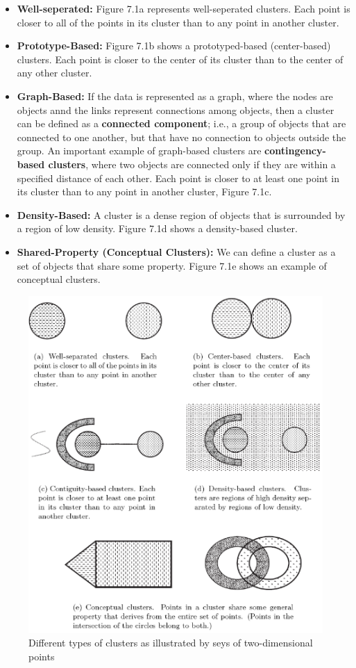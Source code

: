 		\begin{itemize}
			\item {\bf Well-seperated:} Figure 7.1a represents well-seperated clusters.
			Each point is closer to all of the points in its cluster than to any point 
			in another cluster.
			\item {\bf Prototype-Based:} Figure 7.1b shows a prototyped-based (center-based)
			clusters. Each point is closer to the center of its cluster than to the center of any
			other cluster. 
			\item {\bf Graph-Based:} If the data is represented as a graph, where the nodes
			are objects annd the links represent connections among objects, then a cluster can be
			defined as a {\bf connected component}; i.e., a group of objects that are connected
			to one another, but that have no connection to objects outside the group. An
			important example of graph-based clusters are {\bf contingency-based clusters}, where
			two objects are connected only if they are within a specified distance of each other. 
			Each point is closer to at least one point in its cluster than to any point in another 
			cluster, Figure 7.1c. 
			\item {\bf Density-Based:} A cluster is a dense region of objects that is surrounded by
			a region of low density. Figure 7.1d shows a density-based cluster.
			\item {\bf Shared-Property (Conceptual Clusters):} We can define a cluster as a set of 
			objects that share some property. Figure 7.1e shows an example of conceptual clusters.
		\end{itemize} 



		\begin{figure}[H]
			\centering
			\includegraphics[scale=0.6]{pics/clusters.png}
			\caption{Different types of clusters as illustrated by seys of two-dimensional points}
		\end{figure}

